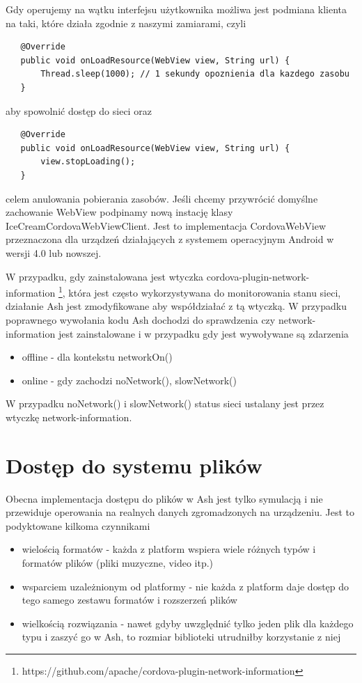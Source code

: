 \documentclass[brudnopis]{xmgr}
\begin{document}
Gdy operujemy na wątku interfejsu użytkownika możliwa jest podmiana klienta na taki, które działa zgodnie z naszymi zamiarami, czyli 

\begin{lstlisting}
   @Override
   public void onLoadResource(WebView view, String url) {
       Thread.sleep(1000); // 1 sekundy opoznienia dla kazdego zasobu
   }
\end{lstlisting}

aby spowolnić dostęp do sieci oraz

\begin{lstlisting}
   @Override
   public void onLoadResource(WebView view, String url) {
       view.stopLoading();
   }
\end{lstlisting}

celem anulowania pobierania zasobów. Jeśli chcemy przywrócić domyślne zachowanie WebView podpinamy nową instację klasy IceCreamCordovaWebViewClient. Jest to implementacja CordovaWebView przeznaczona dla urządzeń działających z systemem operacyjnym Android w wersji 4.0 lub nowszej.

W przypadku, gdy zainstalowana jest wtyczka cordova-plugin-network-information \footnote{https://github.com/apache/cordova-plugin-network-information}, która jest często wykorzystywana do monitorowania stanu sieci, działanie Ash jest zmodyfikowane aby współdziałać z tą wtyczką. W przypadku poprawnego wywołania kodu Ash dochodzi do sprawdzenia czy network-information jest zainstalowane i w przypadku gdy jest wywoływane są zdarzenia

\begin{itemize}
  \item offline - dla kontekstu networkOn() 
  \item online - gdy zachodzi noNetwork(), slowNetwork()
\end{itemize}

W przypadku noNetwork() i slowNetwork() status sieci ustalany jest przez wtyczkę network-information.

\section{Dostęp do systemu plików}

Obecna implementacja dostępu do plików w Ash jest tylko symulacją i nie przewiduje operowania na realnych danych zgromadzonych na urządzeniu. Jest to podyktowane kilkoma czynnikami

\begin{itemize}
  \item wielością formatów - każda z platform wspiera wiele różnych typów i formatów plików (pliki muzyczne, video itp.) 
  \item wsparciem uzależnionym od platformy - nie każda z platform daje dostęp do tego samego zestawu formatów i rozszerzeń plików
  \item wielkością rozwiązania - nawet gdyby uwzględnić tylko jeden plik dla każdego typu i zaszyć go w Ash, to rozmiar biblioteki utrudniłby korzystanie z niej
\end{itemize}
\end{document}

